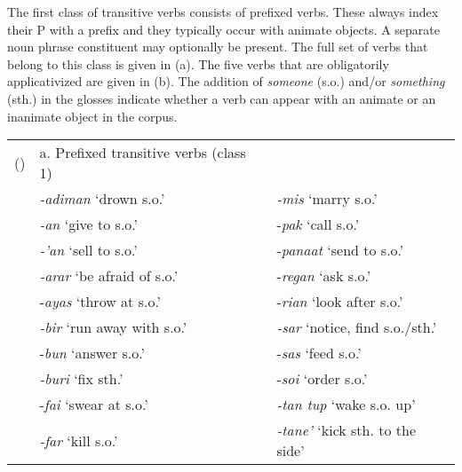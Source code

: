 The first class of transitive verbs consists of prefixed verbs. These always index their P with a prefix and they typically occur with animate objects. A separate noun phrase constituent may optionally be present. The full set of verbs that belong to this class is given in (a). The five verbs that are obligatorily applicativized are given in (b). The addition of \textit{someone} (s.o.) and/or \textit{something} (sth.) in the glosses indicate whether a verb can appear with an animate or an inanimate object in the corpus. 

\begin{flushleft}
\tablehead{}
\begin{supertabular}{m{0.48795983in}m{2.5781598in}m{3.07266in}}
\label{bkm:Ref324859969}() &
a. Prefixed transitive verbs (class 1) &
\\
 &
\textit{{}-adiman} {\textquoteleft}drown s.o.{\textquoteright} &
\textit{{}-mis} {\textquoteleft}marry s.o.{\textquoteright}\\
 &
\textit{{}-an} {\textquoteleft}give to s.o.{\textquoteright} &
{}-\textit{pak} {\textquoteleft}call s.o.{\textquoteright}\\
 &
\textit{{}-{\textquoteright}an} {\textquoteleft}sell to s.o.{\textquoteright} &
{}-\textit{panaat }{\textquoteleft}send to s.o.{\textquoteright}\\
 &
\textit{{}-arar} {\textquoteleft}be afraid of s.o.{\textquoteright} &
{}-\textit{regan }{\textquoteleft}ask s.o.{\textquoteright}\\
 &
{}-\textit{ayas} {\textquoteleft}throw at s.o.{\textquoteright} &
{}-\textit{rian} {\textquoteleft}look after s.o.{\textquoteright}\\
 &
\textit{{}-bir} {\textquoteleft}run away with s.o.{\textquoteright} &
\textit{{}-sar }{\textquoteleft}notice, find s.o./sth.{\textquoteright}\\
 &
{}-\textit{bun} {\textquoteleft}answer s.o.{\textquoteright} &
{}-\textit{sas} {\textquoteleft}feed s.o.{\textquoteright}\\
 &
\textit{{}-buri} {\textquoteleft}fix sth.{\textquoteright} &
{}-\textit{soi} {\textquoteleft}order s.o.{\textquoteright}\\
 &
{}-\textit{fai} {\textquoteleft}swear at s.o.{\textquoteright} &
\textit{{}-tan tup} {\textquoteleft}wake s.o. up{\textquoteright}\\
 &
\textit{{}-far} {\textquoteleft}kill s.o.{\textquoteright} &
\textit{{}-tane{\textquoteright} }{\textquoteleft}kick sth. to the side{\textquoteright}\\

\end{supertabular}
\end{flushleft}
